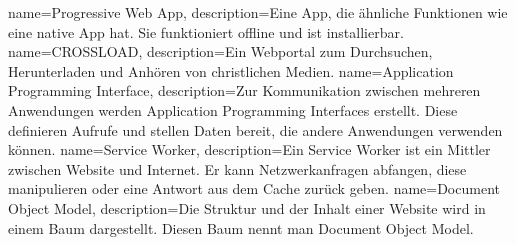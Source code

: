 {
        name=Progressive Web App,
        description={Eine App, die ähnliche Funktionen wie eine native App hat. Sie funktioniert offline und ist installierbar.}
}
{
        name=CROSSLOAD,
        description={Ein Webportal zum Durchsuchen, Herunterladen und Anhören von christlichen Medien.}
}
{
        name=Application Programming Interface,
        description={Zur Kommunikation zwischen mehreren Anwendungen werden Application Programming Interfaces erstellt. Diese definieren Aufrufe und stellen Daten bereit, die andere Anwendungen verwenden können.}
}
{
        name=Service Worker,
        description={Ein Service Worker ist ein Mittler zwischen Website und Internet. Er kann Netzwerkanfragen abfangen, diese manipulieren oder eine Antwort aus dem Cache zurück geben.}
}
{
        name=Document Object Model,
        description={Die Struktur und der Inhalt einer Website wird in einem Baum dargestellt. Diesen Baum nennt man Document Object Model.}
}
